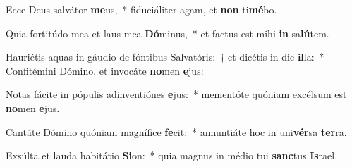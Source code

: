 \item Ecce Deus salvátor \textbf{me}us,~* fiduciáliter agam, et \textbf{non} ti\textbf{mé}bo.
\item Quia fortitúdo mea et laus mea \textbf{Dó}minus,~* et factus est mihi \textbf{in} sa\textbf{lú}tem.
\item Hauriétis aquas in gáudio de fóntibus Salvatóris:~† et dicétis in die \textbf{il}la:~* Confitémini Dómino, et invocáte \textbf{no}men \textbf{e}jus:
\item Notas fácite in pópulis adinventiónes \textbf{e}jus:~* mementóte quóniam excélsum est \textbf{no}men \textbf{e}jus.
\item Cantáte Dómino quóniam magnífice \textbf{fe}cit:~* annuntiáte hoc in uni\textbf{vér}sa \textbf{ter}ra.
\item Exsúlta et lauda habitátio \textbf{Si}on:~* quia magnus in médio tui \textbf{sanc}tus \textbf{Is}rael.
